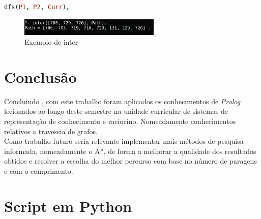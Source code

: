 \documentclass[a4paper]{report}
\begin{document}
\begin{lstlisting}[language=Prolog]
dfs(P1, P2, Curr),
\end{lstlisting}

\begin{figure}[H]
    \centering 
    \includegraphics[width=0.6\textwidth]{images/inter.png}
    \caption{Exemplo de inter}
\end{figure}

\chapter{Conclusão}
Concluindo , com este trabalho foram aplicados os conhecimentos de
\textit{Prolog} lecionados ao longo deste semestre na unidade curricular de
sistemas de representação de conhecimento e raciocino. Nomeadamente
conhecimentos relativos a travessia de grafos.\\
Como trabalho futuro seria relevante implementar mais métodos de pesquisa
informada, nomeadamente o A*, de forma a melhorar a qualidade dos resultados
obtidos e resolver a escolha do melhor percurso com base no número de paragens e
com o comprimento.

\appendix
\chapter{Script em Python}\label{app:script}

\end{document}
